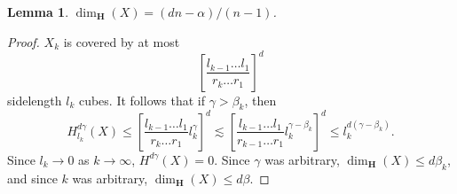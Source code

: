 \documentclass[usenames,dvipsnames]{article}
\theoremstyle{plain}
\newtheorem{lemma}{Lemma}
\theoremstyle{plain}
\begin{document}
\begin{lemma}
	$\dim_{\mathbf{H}}(X) = (dn - \alpha)/(n-1)$.
\end{lemma}
\begin{proof}
	$X_k$ is covered by at most
	\[ \left[ \frac{l_{k-1} \dots l_1}{r_k \dots r_1} \right]^d \]
	sidelength $l_k$ cubes. It follows that if $\gamma > \beta_k$, then
	\[ H^{d\gamma}_{l_k}(X) \leq \left[ \frac{l_{k-1} \dots l_1}{r_k \dots r_1} l_k^\gamma \right]^d \lesssim \left[ \frac{l_{k-1} \dots l_1}{r_{k-1} \dots r_1} l_k^{\gamma - \beta_k} \right]^d \leq l_k^{d(\gamma - \beta_k)}. \]
	Since $l_k \to 0$ as $k \to \infty$, $H^{d \gamma}(X) = 0$. Since $\gamma$ was arbitrary, $\dim_{\mathbf{H}}(X) \leq d \beta_k$, and since $k$ was arbitrary, $\dim_{\mathbf{H}}(X) \leq d \beta$.
\end{proof}


\end{document}
